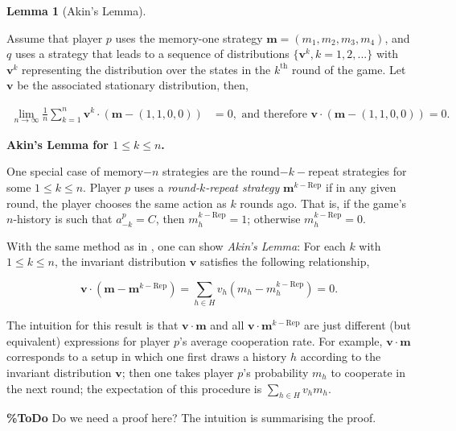 \documentclass{article}
\theoremstyle{definition}
\newtheorem{lemma}[theorem]{Lemma}
\begin{document}
\begin{lemma}[Akin's Lemma]\label{lemma:akin}

Assume that player \(p\) uses the memory-one strategy \(\mathbf{m}=(m_1, m_2,
m_3, m_4)\), and \(q\) uses a strategy that leads to a sequence of distributions
\(\{\mathbf{v}^{k}, k = 1, 2, ...\}\) with \(\mathbf{v}^{k}\) representing the
distribution over the states in the \(k^{\text{th}}\) round of the game. Let
\(\mathbf{v}\) be the associated stationary distribution, then,

    \begin{align}
      \lim_{n \rightarrow \infty} \frac{1}{n} \sum_{k=1}^{n} \mathbf{v}^{k} \cdot (\mathbf{m} - (1, 1, 0 , 0)) & = 0, \text{ and therefore } \mathbf{v} \cdot (\mathbf{m} - (1, 1, 0, 0)) = 0.
    \end{align}
\end{lemma}

\textbf{Akin's Lemma for $1\!\le\!k\!\le\!n$.}

One special case of memory$-n$ strategies are the round$-k-$repeat strategies for
some $1\!\le\!k\!\le\!n$. Player $p$ uses a
{\it round-$k$-repeat strategy} $\mathbf{m}^{k-\text{Rep}}$ if in any given
round, the player chooses the same action as $k$ rounds ago. That is, if the
game's $n$-history is such that $a^p_{-k}\!=\!C$, then
$m^{k-\text{Rep}}_h\!=\!1$; otherwise $m^{k-\text{Rep}}_h\!=\!0$.

With the same method as in \citep{akin:EGADS:2016}, one can show {\it Akin's
Lemma}: For each $k$ with $1\!\le\!k\!\le\!n$, the invariant distribution
$\mathbf{v}$ satisfies the following relationship,

\begin{equation} \label{Eq:AkinsLemma}
\mathbf{v} \cdot (\mathbf{m}-\mathbf{m}^{k-\text{Rep}}) \!=\! \sum_{h\in H} v_h (m_h-m_h^{k-\text{Rep}}) = 0.
\end{equation}

The intuition for this result is that $\mathbf{v}\cdot \mathbf{m}$ and all
$\mathbf{v}\cdot \mathbf{m}^{k-\text{Rep}}$ are just different (but equivalent)
expressions for player $p$'s average cooperation rate. For example,
$\mathbf{v}\cdot\mathbf{m}$ corresponds to a setup in which one first draws a
history $h$ according to the invariant distribution $\mathbf{v}$; then one takes
player $p$'s probability $m_h$ to cooperate in the next round; the expectation
of this procedure is $\sum_{h\in H} v_h m_h$.

{\bf \%ToDo} Do we need a proof here? The intuition is summarising the proof.
\end{document}
